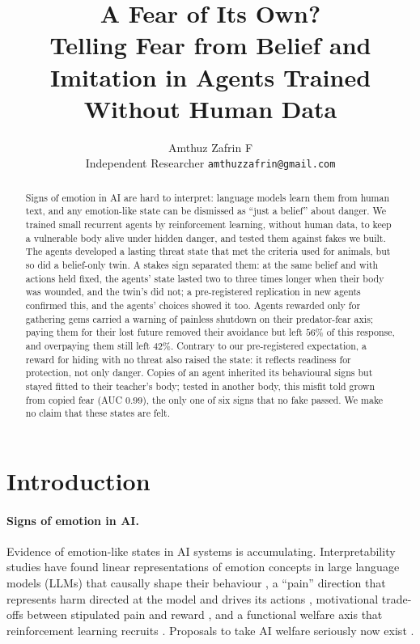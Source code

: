 \documentclass[11pt]{article}
\title{A Fear of Its Own?\\Telling Fear from Belief and Imitation in Agents Trained Without Human Data}
\author{Amthuz Zafrin F\\[2pt]\small Independent Researcher \quad \texttt{amthuzzafrin@gmail.com}}
\date{}
\begin{document}
\maketitle

\begin{abstract}
Signs of emotion in AI are hard to interpret: language models learn them from human text, and any emotion-like state can be dismissed as ``just a belief'' about danger. We trained small recurrent agents by reinforcement learning, without human data, to keep a vulnerable body alive under hidden danger, and tested them against fakes we built. The agents developed a lasting threat state that met the criteria used for animals, but so did a belief-only twin. A stakes sign separated them: at the same belief and with actions held fixed, the agents' state lasted two to three times longer when their body was wounded, and the twin's did not; a pre-registered replication in new agents confirmed this, and the agents' choices showed it too. Agents rewarded only for gathering gems carried a warning of painless shutdown on their predator-fear axis; paying them for their lost future removed their avoidance but left $56\%$ of this response, and overpaying them still left $42\%$. Contrary to our pre-registered expectation, a reward for hiding with no threat also raised the state: it reflects readiness for protection, not only danger. Copies of an agent inherited its behavioural signs but stayed fitted to their teacher's body; tested in another body, this misfit told grown from copied fear (AUC $0.99$), the only one of six signs that no fake passed. We make no claim that these states are felt.
\end{abstract}


\section{Introduction}

\paragraph{Signs of emotion in AI.} Evidence of emotion-like states in AI systems is accumulating. Interpretability studies have found linear representations of emotion concepts in large language models (LLMs) that causally shape their behaviour \cite{anthropic2026emotion}, a ``pain'' direction that represents harm directed at the model and drives its actions \cite{tagliabue2026pain}, motivational trade-offs between stipulated pain and reward \cite{keeling2024tradeoffs,bianco2026tracing}, and a functional welfare axis that reinforcement learning recruits \cite{han2026welfare}. Proposals to take AI welfare seriously now exist \cite{long2024welfare}.
\end{document}
